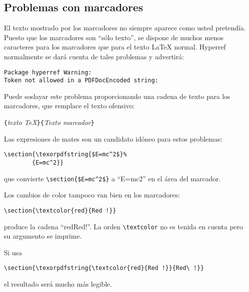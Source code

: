 \subsection{Problemas con marcadores}

El texto mostrado por los marcadores no siempre aparece como usted pretendía.  Puesto que los marcadores son ``sólo texto'', se dispone de muchos menos caracteres para los marcadores que para el texto \LaTeX{} normal.
Hyperref normalmente se dará cuenta de tales problemas y advertirá:
\begin{code}
\begin{verbatim}
Package hyperref Warning: 
Token not allowed in a PDFDocEncoded string:
\end{verbatim}
\end{code}
Puede soslayar este problema proporcionando una cadena de texto para los marcadores, que remplace el texto ofensivo:
\begin{lscommand}
\verb|{|\emph{texto \TeX{}}\verb|}{|\emph{Texto
    marcador}\verb|}|
\end{lscommand}

Las expresiones de mates son un candidato idóneo para estos problemas:
\begin{code}
\begin{verbatim}
\section{\texorpdfstring{$E=mc^2$}%
        {E=mc^2}}
\end{verbatim}
\end{code}
que convierte \verb+\section{$E=mc^2$}+ a ``E=mc2'' en el área del marcador.

Los cambios de color tampoco van bien en los marcadores:
\begin{code}
\verb+\section{\textcolor{red}{Red !}}+
\end{code}
produce la cadena ``redRed!''.  La orden \verb+\textcolor+ no es tenida en cuenta pero su argumento se imprime.

Si usa
\begin{code}
\verb+\section{\texorpdfstring{\textcolor{red}{Red !}}{Red\ !}}+
\end{code}
el resultado será mucho más legible.

